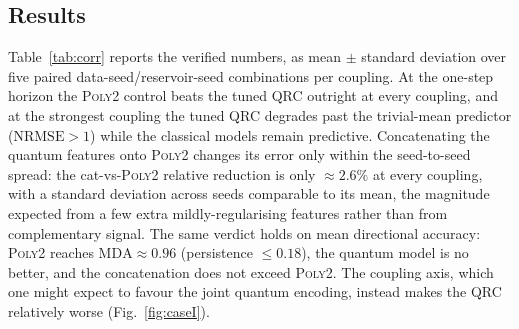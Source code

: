 ﻿\documentclass[10pt,conference]{IEEEtran}
\newcommand{\nrmse}{\mathrm{NRMSE}}
\begin{document}
\subsection{Results}

Table~\ref{tab:corr} reports the verified numbers, as mean $\pm$ standard
deviation over five paired data-seed/reservoir-seed combinations per coupling.
At the one-step horizon the \textsc{Poly2} control beats the tuned QRC outright at
every coupling, and at the strongest coupling the tuned QRC degrades past the
trivial-mean predictor ($\nrmse>1$) while the classical models remain predictive.
Concatenating the quantum features onto \textsc{Poly2} changes its error only
within the seed-to-seed spread: the cat-vs-\textsc{Poly2} relative reduction is
only $\approx\!2.6\%$ at every coupling, with a standard deviation across seeds
comparable to its mean, the magnitude expected from a few extra mildly-regularising features rather
than from complementary signal. The same verdict holds on mean directional
accuracy: \textsc{Poly2} reaches $\mathrm{MDA}\approx 0.96$ (persistence $\le
0.18$), the quantum model is no better, and the concatenation does not exceed
\textsc{Poly2}. The coupling axis, which one might expect to favour the joint
quantum encoding, instead makes the QRC relatively worse (Fig.~\ref{fig:caseI}).

\begin{table}[H]
\centering
\caption{Case study I (one-step, observation noise $0.1$): correlator QRC vs.\
the capacity-matched \textsc{Poly2} control and their concatenation, on coupled
H\'enon dynamics at three couplings $c$. Values are mean $\pm$ s.d.\ over five
data-seed $\times$ reservoir-seed pairs; lower $\nrmse$ is better, $\nrmse<1$
predictive. ``cat'' is $\textsc{Poly2}\oplus\textsc{QRC}$; the final column is the
relative $\nrmse$ reduction of cat over \textsc{Poly2}. Windowed feature
dimensions: QRC $72$, \textsc{Poly2} $135$, so the polynomial is given \emph{more}
capacity, not less.}
\label{tab:corr}
\setlength{\tabcolsep}{4pt}
\end{table}
\end{document}
